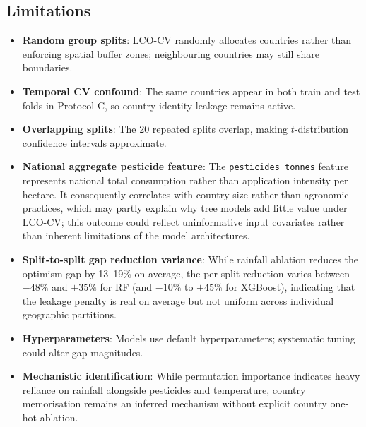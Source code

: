 \documentclass[conference]{IEEEtran}
\begin{document}
\subsection{Limitations}
\label{sec:limitations}

\begin{itemize}
    \item \textbf{Random group splits}: LCO-CV randomly allocates countries rather 
    than enforcing spatial buffer zones; neighbouring countries may still share boundaries.
    
    \item \textbf{Temporal CV confound}: The same countries appear in both train and test 
    folds in Protocol C, so country-identity leakage remains active.
    
    \item \textbf{Overlapping splits}: The 20 repeated splits overlap, making $t$-distribution 
    confidence intervals approximate.
    
    \item \textbf{National aggregate pesticide feature}: The \texttt{pesticides\_tonnes} 
    feature represents national total consumption rather than application intensity per hectare. 
    It consequently correlates with country size rather than agronomic practices, which may 
    partly explain why tree models add little value under LCO-CV; this outcome could reflect 
    uninformative input covariates rather than inherent limitations of the model architectures.
    
    \item \textbf{Split-to-split gap reduction variance}: While rainfall ablation reduces 
    the optimism gap by 13--19\% on average, the per-split reduction varies between $-48\%$ 
    and $+35\%$ for RF (and $-10\%$ to $+45\%$ for XGBoost), indicating that the leakage 
    penalty is real on average but not uniform across individual geographic partitions.
    
    \item \textbf{Hyperparameters}: Models use default hyperparameters; systematic tuning 
    could alter gap magnitudes.
    
    \item \textbf{Mechanistic identification}: While permutation importance indicates heavy 
    reliance on rainfall alongside pesticides and temperature, country memorisation remains 
    an inferred mechanism without explicit country one-hot ablation.
\end{itemize}
\end{document}
